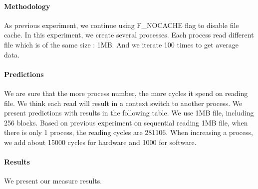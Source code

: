 \paragraph{Methodology}
As previous experiment, we continue using F\_NOCACHE flag to disable file cache. In this experiment, we create several processes. Each process read different file which is of the same size : 1MB. And we iterate 100 times to get average data. 

\paragraph{Predictions}
We are sure that the more process number, the more cycles it spend on reading file. We think each read will result in a context switch to another process. We present predictions with results in the following table. We use 1MB file, including 256 blocks. Based on previous experiment on sequential reading 1MB file, when there is only 1 process, the reading cycles are 281106. When increasing a process, we add about 15000 cycles for hardware and 1000 for software.

\paragraph{Results}
We present our measure results.

